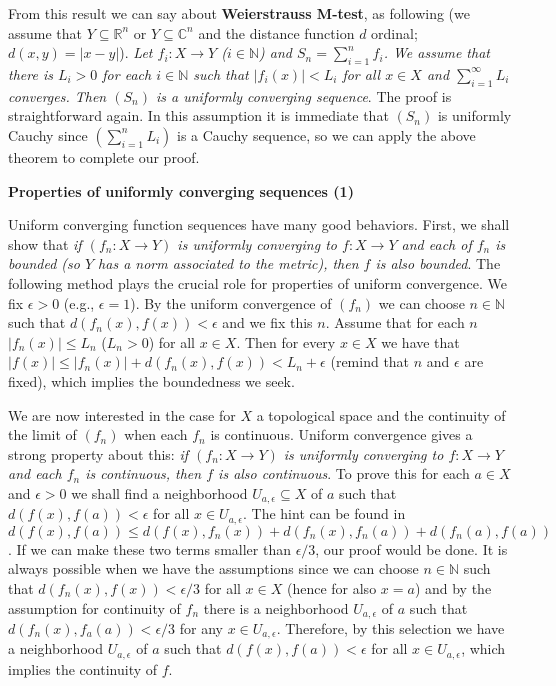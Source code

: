 \documentclass{article}
\newcommand{\NaN}{\mathbb{N}}
\newcommand{\ReR}{\mathbb{R}}
\newcommand{\CmC}{\mathbb{C}}
\begin{document}
From this result we can say about \textbf{Weierstrauss M-test}, as following (we assume that $Y \subseteq \ReR^n$ or $Y \subseteq \CmC^n$ and the distance function $d$ ordinal; $d(x, y) = |x - y|$).
\textit{Let $f_i : X \to Y$ ($i \in \NaN$) and $S_n = \sum_{i = 1}^n f_i$.
We assume that there is $L_i > 0$ for each $i \in \NaN$ such that $|f_i(x)| < L_i$ for all $x \in X$ and $\sum_{i = 1}^\infty L_i$ converges.
Then $(S_n)$ is a uniformly converging sequence}.
The proof is straightforward again.
In this assumption it is immediate that $(S_n)$ is uniformly Cauchy since $(\sum_{i = 1}^n L_i)$ is a Cauchy sequence, so we can apply the above theorem to complete our proof.

\newpage

\textbf{Properties of uniformly converging sequences (1)}

Uniform converging function sequences have many good behaviors.
First, we shall show that \textit{if $(f_n : X \to Y)$ is uniformly converging to $f : X \to Y$ and each of $f_n$ is bounded (so $Y$ has a norm associated to the metric), then $f$ is also bounded}.
The following method plays the crucial role for properties of uniform convergence.
We fix $\epsilon > 0$ (e.g., $\epsilon = 1$).
By the uniform convergence of $(f_n)$ we can choose $n \in \NaN$ such that $d(f_n(x), f(x)) < \epsilon$ and we fix this $n$.
Assume that for each $n$ $|f_n(x)| \le L_n$ ($L_n > 0$) for all $x \in X$.
Then for every $x \in X$ we have that $|f(x)| \le |f_n(x)| + d(f_n(x), f(x)) < L_n + \epsilon$ (remind that $n$ and $\epsilon$ are fixed), which implies the boundedness we seek.

We are now interested in the case for $X$ a topological space and the continuity of the limit of $(f_n)$ when each $f_n$ is continuous.
Uniform convergence gives a strong property about this: \textit{if $(f_n : X \to Y)$ is uniformly converging to $f : X \to Y$ and each $f_n$ is continuous, then $f$ is also continuous}.
To prove this for each $a \in X$ and $\epsilon > 0$ we shall find a neighborhood $U_{a, \epsilon} \subseteq X$ of $a$ such that $d(f(x), f(a)) < \epsilon$ for all $x \in U_{a, \epsilon}$.
The hint can be found in $d(f(x), f(a)) \le d(f(x), f_n(x)) + d(f_n(x), f_n(a)) + d(f_n(a), f(a))$.
If we can make these two terms smaller than $\epsilon/3$, our proof would be done.
It is always possible when we have the assumptions since we can choose $n \in \NaN$ such that $d(f_n(x), f(x)) < \epsilon/3$ for all $x \in X$ (hence for also $x = a$) and by the assumption for continuity of $f_n$ there is a neighborhood $U_{a, \epsilon}$ of $a$ such that $d(f_n(x), f_a(a)) < \epsilon/3$ for any $x \in U_{a, \epsilon}$.
Therefore, by this selection we have a neighborhood $U_{a, \epsilon}$ of $a$ such that $d(f(x), f(a)) < \epsilon$ for all $x \in U_{a, \epsilon}$, which implies the continuity of $f$.
\end{document}
